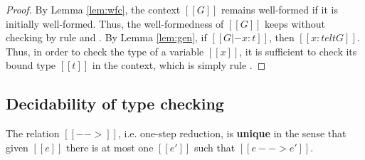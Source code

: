 \begin{proof}
	By Lemma \ref{lem:wfc}, the context $[[G]]$ remains well-formed if it is initially well-formed. Thus, the well-formedness of $[[G]]$ keeps without checking by rule  and . By Lemma \ref{lem:gen}, if $[[G |- x:t]]$, then $[[x:t elt G]]$. Thus, in order to check the type of a variable $[[x]]$, it is sufficient to check its bound type $[[t]]$ in the context, which is simply rule .
\end{proof}

\subsection{Decidability of type checking}
\begin{lem}\label{lem:unired}
	The relation $[[-->]]$, i.e. one-step reduction, is \textbf{unique} in the sense that given $[[e]]$ there is at most one $[[e']]$ such that $[[e --> e']]$.
\end{lem}

